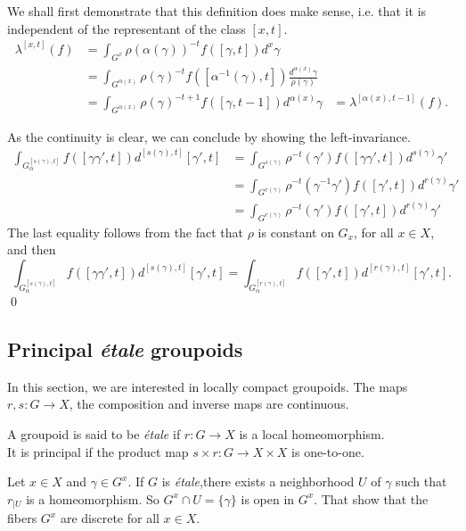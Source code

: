 \begin{dem}
We shall first demonstrate that this definition does make sense, i.e. that it is independent of the representant of the class $[x,t]$.
\begin{align*}
\lambda^{[x,t]}(f) & =\int _{G^x} \rho (\alpha(\gamma))^{-t} f([\gamma,t]) d^x \gamma \\
			& =\int_{G^{\alpha(x)}}\rho(\gamma)^{-t}     f([\alpha^{-1}(\gamma),t])  \frac{d^{\alpha(x)} \gamma}{\rho(\gamma)} \\
			& =\int_{G^{\alpha(x)}}\rho(\gamma)^{-t+1}f([\gamma,t-1])d^{\alpha(x)} \gamma
			& = \lambda^{[\alpha(x),t-1]}(f).
\end{align*}

As the continuity is clear, we can conclude by showing the left-invariance.
\begin{align*}
\int_{G_\alpha^{[s(\gamma),t]}} f([\gamma\gamma',t])d^{[s(\gamma),t]}[\gamma',t] &= \int_{G^{s(\gamma)}} \rho^{-t}(\gamma') f([\gamma\gamma',t])d^{s(\gamma)} \gamma' \\
			&= \int_{G^{r(\gamma)}} \rho^{-t}(\gamma^{-1}\gamma') f([\gamma',t]) d^{r(\gamma)}\gamma' 		\\
			&= \int_{G^{r(\gamma)}} \rho^{-t}(\gamma') f([\gamma',t]) d^{r(\gamma)}\gamma'
\end{align*}
The last equality follows from the fact that $\rho$ is constant on $G_x$, for all $x\in X$, and then
\[\int_{G_\alpha^{[s(\gamma),t]}} f([\gamma\gamma',t])d^{[s(\gamma),t]}[\gamma',t] = \int_{G_\alpha^{[r(\gamma),t]}} f([\gamma',t])d^{[r(\gamma),t]}[\gamma',t]. \] 
\qed 
\end{dem}

\subsection{Principal \textit{étale} groupoids}
In this section, we are interested in locally compact groupoids. The maps $r,s :G\rightarrow X$, the composition and inverse maps are continuous.

\begin{definition}
A groupoid is said to be \textit{étale} if $r: G\rightarrow X$ is a local homeomorphism.\\
It is principal if the product map $s\times r : G\rightarrow X \times X$ is one-to-one. 
\end{definition}

Let $x\in X$ and $\gamma\in G^x$. If $G$ is \textit{étale},there exists a neighborhood $U$ of $\gamma$ such that $r_{|U}$ is a homeomorphism. So $G^x\cap U=\{\gamma\}$ is open in $G^x$. That show that the fibers $G^x$ are discrete for all $x\in X$.\\ 

